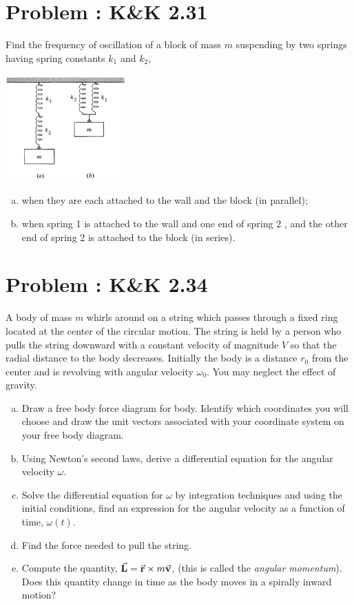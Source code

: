 \documentclass[problems]{esg8012pset}
\begin{document}
\section{Problem \thesection: K\&K 2.31}
  Find the frequency of oscillation of a block of mass $m$ suspending by two springs having spring constants $k_1$ and $k_2$,
  \begin{center}\includegraphics[width=0.35\textwidth]{ps03_4}\end{center}
  \begin{enumerate}[a)]
    \item when they are each attached to the wall and the block (in parallel);
    \item when spring 1 is attached to the wall and one end of spring 2 , and the other end of spring 2 is attached to the block (in series).
  \end{enumerate}
\section{Problem \thesection: K\&K 2.34}
  A body of mass $m$ whirls around on a string which passes through a fixed ring located at the center of the circular motion. The string is held by a person who pulls the string downward with a constant velocity of magnitude $V$ so that the radial distance to the body decreases. Initially the body is a distance $r_0$ from the center and is revolving
with angular velocity $\omega_0$. You may neglect the effect of gravity.
  \begin{enumerate}[a)]
    \item Draw a free body force diagram for body. Identify which coordinates you will choose and draw the unit vectors associated with your coordinate system on your free body diagram.
    \item Using Newton's second laws, derive a differential equation for the angular velocity $\omega$.
    \item Solve the differential equation for $\omega$ by integration techniques and using the initial conditions, find an expression for the angular velocity as a function of time, $\omega(t)$.
    \item Find the force needed to pull the string.
    \item Compute the quantity, $\vec{\bf{L}} = \vec{\bf{r}}\times m\vec{\bf{v}}$, (this is called the \emph{angular momentum}). Does this quantity change in time as the body moves in a spirally inward motion?
  \end{enumerate}
\end{document}
